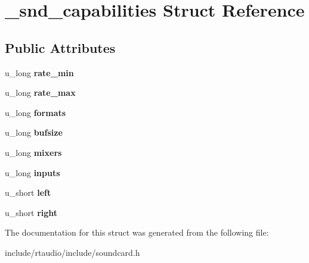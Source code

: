\hypertarget{struct__snd__capabilities}{}\section{\+\_\+snd\+\_\+capabilities Struct Reference}
\label{struct__snd__capabilities}
\subsection*{Public Attributes}
\begin{DoxyCompactItemize}
\item 
u\+\_\+long {\bfseries rate\+\_\+min}\hypertarget{struct__snd__capabilities_a283d42aeac0fd1d17537d4590bc3a15d}{}\label{struct__snd__capabilities_a283d42aeac0fd1d17537d4590bc3a15d}

\item 
u\+\_\+long {\bfseries rate\+\_\+max}\hypertarget{struct__snd__capabilities_a9f5797771135c8141f6f8baeaedbaf2f}{}\label{struct__snd__capabilities_a9f5797771135c8141f6f8baeaedbaf2f}

\item 
u\+\_\+long {\bfseries formats}\hypertarget{struct__snd__capabilities_adf7fd4123127222602bfb76811a0925b}{}\label{struct__snd__capabilities_adf7fd4123127222602bfb76811a0925b}

\item 
u\+\_\+long {\bfseries bufsize}\hypertarget{struct__snd__capabilities_ae2c989b74411c3b8618c019e9fef6707}{}\label{struct__snd__capabilities_ae2c989b74411c3b8618c019e9fef6707}

\item 
u\+\_\+long {\bfseries mixers}\hypertarget{struct__snd__capabilities_ad359e9ae18337af2b24b8aa4d4262ba7}{}\label{struct__snd__capabilities_ad359e9ae18337af2b24b8aa4d4262ba7}

\item 
u\+\_\+long {\bfseries inputs}\hypertarget{struct__snd__capabilities_a21b9a2766bb94b088464347963acca07}{}\label{struct__snd__capabilities_a21b9a2766bb94b088464347963acca07}

\item 
u\+\_\+short {\bfseries left}\hypertarget{struct__snd__capabilities_a4861b20bb3515595e61079dd4e4f560b}{}\label{struct__snd__capabilities_a4861b20bb3515595e61079dd4e4f560b}

\item 
u\+\_\+short {\bfseries right}\hypertarget{struct__snd__capabilities_a693fd47fbd9c31d327062bcebf3ca864}{}\label{struct__snd__capabilities_a693fd47fbd9c31d327062bcebf3ca864}

\end{DoxyCompactItemize}


The documentation for this struct was generated from the following file\+:\begin{DoxyCompactItemize}
\item 
include/rtaudio/include/soundcard.\+h\end{DoxyCompactItemize}
